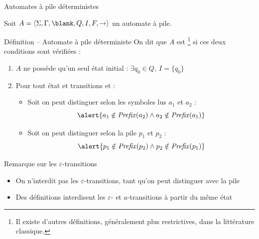 
\begingroup

\begin{frame}{Automates à pile déterministes}

  Soit $A = \langle \Sigma, \Gamma, \blank, Q, I, F, \rightarrow \rangle$ un automate à pile.

  \begin{block}{Définition -- Automate à pile déterministe}
    On dit que $A$ est \footnote{Il existe d'autres définitions, généralement plus restrictives, dans la littérature classique.} si ces deux conditions sont vérifiées : 
    \begin{enumerate}
    \item $A$ ne possède qu'un seul état initial : \alert{$\exists q_0\in Q,~I = \{q_0\}$}
    \item Pour tout état  et transitions 
      et  :
      \begin{itemize}
      \item\vspace{2mm} Soit on peut distinguer selon les symboles lus $a_1$ et $a_2$ :
        $$\alert{a_1 \notin \mathit{Prefix}(a_2) \land a_2 \notin \mathit{Prefix}(a_1)}$$
      \item Soit on peut distinguer selon la pile  $p_1$ et $p_2$ :
        $$\alert{p_1 \notin \mathit{Prefix}(p_2) \land p_2 \notin \mathit{Prefix}(p_1)}$$
      \end{itemize}
    \end{enumerate}
  \end{block}

  \begin{block}{Remarque sur les $\varepsilon$-transitions}
    \begin{itemize}
    \item On n'interdit pas les $\varepsilon$-transitions, tant qu'on peut distinguer avec la pile
    \item Des définitions interdisent les $\varepsilon$- et $a$-transitions à partir du même état
    \end{itemize}
  \end{block}

\end{frame}

\endgroup
\endinput
